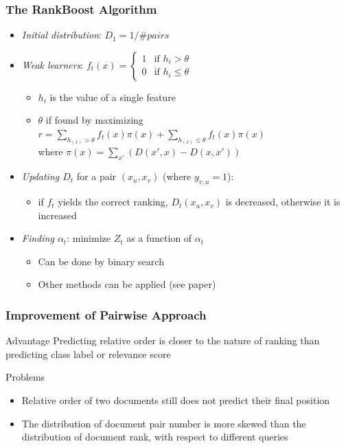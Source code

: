 \documentclass{beamer}
\begin{document}
\begin{frame}
    \frametitle{The RankBoost Algorithm}

    \begin{itemize}
    \item \emph{Initial distribution}: $D_1 = 1/\#pairs$
    \item \emph{Weak learners}:
        $
            f_t(x) =
            \begin{cases}
                1 & \text{if $h_i > \theta$} \\
                0 & \text{if $h_i \leq \theta$}
            \end{cases}
$
        \begin{itemize}
        \item $h_i$ is the value of a single feature
        \item $\theta$ if found by maximizing\\
            $r = \sum_{h_(x)>\theta}f_t(x)\pi(x) + \sum_{h_(x)\leq\theta}f_t(x)\pi(x)$\\ %
            where $\pi(x) = \sum_{x'}(D(x',x)-D(x,x'))$
        \end{itemize}
    \item \emph{Updating $D_t$} for a pair $(x_u,x_v)$ (where $y_{v,u}=1$):
        \begin{itemize}
        \item if $f_t$ yields the correct ranking, $D_t(x_u,x_v)$ is decreased,
            otherwise it is increased
        \end{itemize}
    \item \emph{Finding $\alpha_t$}: minimize $Z_t$ as a function of $\alpha_t$
        \begin{itemize}
        \item Can be done by binary search
        \item Other methods can be applied (see paper)
        \end{itemize}
    \end{itemize}
\end{frame}

\begin{frame}
    \frametitle{Improvement of Pairwise Approach}
    \begin{block}{Advantage}
        Predicting relative order is closer to the nature of ranking than
        predicting class label or relevance score
    \end{block}
    \begin{block}{Problems}
        \begin{itemize}
        \item Relative order of two documents still does not predict their
            final position
        \item The distribution of document pair number is more skewed than the
            distribution of document rank, with respect to different queries
        \end{itemize}
    \end{block}
\end{frame}
\end{document}
